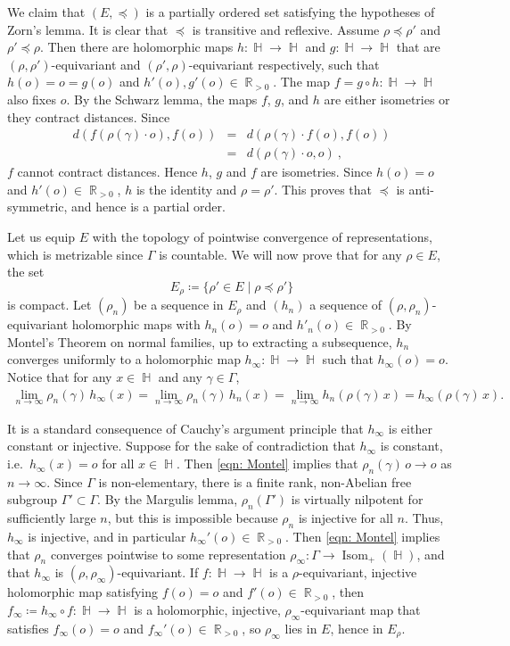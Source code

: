 \documentclass{amsart}
\theoremstyle{plain}
\theoremstyle{definition}
\DeclareMathOperator{\Isom}{Isom}
\DeclareMathOperator{\R}{\mathbb{R}}
\DeclareMathOperator{\Hb}{\mathbb{H}}
\DeclareMathOperator{\Rb}{{\mathbb{R}}}
\newcommand{\1}{\mathbf{1}}
\begin{document}
    We claim that $(E,\preceq)$ is a partially ordered set satisfying the hypotheses of Zorn's lemma. It is clear that $\preceq$ is transitive and reflexive. Assume $\rho \preceq \rho'$ and $\rho' \preceq \rho$. Then there are holomorphic maps $h\colon \Hb\to\Hb$ and $g\colon \Hb\to\Hb$ that are $(\rho,\rho')$-equivariant and $(\rho',\rho)$-equivariant respectively, such that $h(o)=o=g(o)$ and $h'(o),g'(o)\in\Rb_{>0}$. The map $f= g\circ h\colon \Hb \to \Hb$ also fixes $o$. By the Schwarz lemma, the maps $f$, $g$, and $h$ are either isometries or they contract distances. Since
    \begin{eqnarray*}
        d (f(\rho(\gamma) \cdot o), f(o)) & = & d(\rho(\gamma) \cdot f(o), f(o))\\
        &=& d(\rho(\gamma) \cdot o, o)~,
    \end{eqnarray*}
    $f$ cannot contract distances. Hence $h$, $g$ and $f$ are isometries. Since $h(o) = o$ and $h'(o)\in \R_{>0}$, $h$ is the identity and $\rho = \rho'$. This proves that $\preceq$ is anti-symmetric, and hence is a partial order.

    Let us equip $E$ with the topology of pointwise convergence of representations, which is metrizable since $\Gamma$ is countable. We will now prove that for any $\rho\in E$, the set
    \[E_\rho \coloneqq \{\rho' \in E \mid \rho \preceq \rho'\}\] 
    is compact. Let $(\rho_n)$ be a sequence in $E_\rho$ and $(h_n)$ a sequence of $(\rho,\rho_n)$-equivariant holomorphic maps with $h_n(o)=o$ and $h'_n(o)\in \Rb_{>0}$. By Montel's Theorem on normal families, up to extracting a subsequence, $h_n$ converges uniformly to a holomorphic map $h_\infty\colon\Hb \to \Hb$ such that $h_\infty(o)=o$. Notice that for any $x\in\Hb$ and any $\gamma\in\Gamma$, 
    \begin{align} \tag{$\star$}\label{eqn: Montel}
    \lim_{n\to\infty}\rho_n(\gamma)\, h_\infty(x)=\lim_{n\to\infty}\rho_n(\gamma)\, h_n(x)=\lim_{n\to\infty}h_n(\rho(\gamma)\, x)= h_\infty(\rho(\gamma)\,x).
    \end{align}
    
    It is a standard consequence of Cauchy's argument principle that $h_\infty$ is either constant or injective. Suppose for the sake of contradiction that $h_\infty$ is constant, i.e.\ $h_\infty(x)=o$ for all $x\in\Hb$. Then \eqref{eqn: Montel} implies that $\rho_n(\gamma)\, o\to o$ as $n\to\infty$. Since $\Gamma$ is non-elementary, there is a finite rank, non-Abelian free subgroup $\Gamma'\subset\Gamma$. By the Margulis lemma, $\rho_n(\Gamma')$ is virtually nilpotent for sufficiently large $n$, but this is impossible because $\rho_n$ is injective for all $n$. Thus, $h_\infty$ is injective, and in particular $h_\infty'(o)\in \Rb_{>0}$. Then \eqref{eqn: Montel} implies that $\rho_n$ converges pointwise to some representation $\rho_\infty:\Gamma\to\Isom_+(\Hb)$, and that $h_\infty$ is $(\rho,\rho_\infty)$-equivariant. If $f\colon \Hb\to\Hb$ is a $\rho$-equivariant, injective holomorphic map satisfying $f(o)=o$ and $f'(o)\in\Rb_{>0}$, then $f_\infty\coloneqq h_\infty\circ f\colon \Hb\to\Hb$ is a holomorphic, injective, $\rho_\infty$-equivariant map that satisfies $f_\infty(o)=o$ and $f_\infty'(o)\in\Rb_{>0}$, so $\rho_\infty$ lies in $E$, hence in $E_\rho$.
\end{document}
